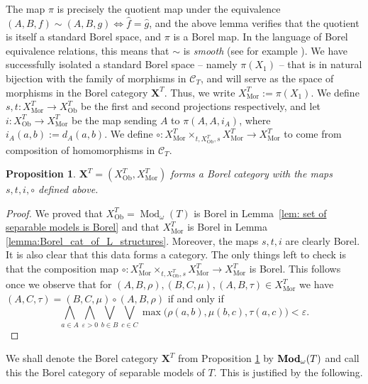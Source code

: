 \documentclass[12pt]{amsart}
\newtheorem{proposition}[theorem]{Proposition}
\DeclareMathOperator{\Mod}{Mod}
\DeclareMathOperator{\bfMod}{\bf{Mod}}
\DeclareMathOperator{\Mor}{Mor}
\DeclareMathOperator{\Ob}{Ob}
\newcommand{\theory}{T}
\begin{document}
The map $\pi$ is precisely the quotient map under the equivalence $(A,B,f)\sim(A,B,g) \iff \widehat{f}=\widehat{g}$, and the above lemma verifies that the quotient is itself a standard Borel space, and $\pi$ is a Borel map. In the language of Borel equivalence relations, this means that $\sim$ is \textit{smooth} (see for example \cite[Definition 3.11]{Kechris_2024}).
We have successfully isolated a standard Borel space -- namely $\pi(X_1)$ -- that is in natural bijection with the family of morphisms in $\mathcal{C}_{\theory}$, and will serve as the space of morphisms in the Borel category $\mathbf{X}^{\theory}$. Thus, we write $X^{\theory}_{\Mor}:=\pi(X_1)$. We define $s,t \colon X^{\theory}_{\Mor} \to X^{\theory}_{\Ob}$ be the first and second projections respectively, and let $i \colon X^{\theory}_{\Ob} \to X^{\theory}_{\Mor}$ be the map sending $A$ to $\pi(A,A,i_A)$, where $i_A(a,b):=d_A(a,b)$. We define $\circ \colon X^{\theory}_{\Mor} \times_{t, X^{\theory}_{\Ob},s} X^{\theory}_{\Mor} \to X^{\theory}_{\Mor}$ to come from composition of homomorphisms in $\mathcal{C}_{\theory}$.

\begin{proposition}\label{proposition:Borel_category_of_L_structures}
    $\mathbf{X}^{\theory}=(X^{\theory}_{\Ob},X^{\theory}_{\Mor})$ forms a Borel category with the maps $s, t, i, \circ$ defined above.
\end{proposition}
\begin{proof}
    We proved that $X^{\theory}_{\Ob}=\Mod_\omega(\theory)$ is Borel in Lemma~\ref{lem: set of separable models is Borel} and that $X^{\theory}_{\Mor}$ is Borel in Lemma \ref{lemma:Borel_cat_of_L_structures}. Moreover, the maps $s,t,i$ are clearly Borel. It is also clear that this data forms a category. The only things left to check is
    that the composition map $\circ \colon X^{\theory}_{\Mor}\times_{t, X^{\theory}_{\Ob},s} X^{\theory}_{\Mor} \to X^{\theory}_{\Mor}$ is Borel.
    This follows once we observe that for $(A,B,\rho),(B,C,\mu),(A,B,\tau)\in X^{\theory}_{\Mor}$ we have $(A,C,\tau)=(B,C,\mu)\circ(A,B,\rho)$ if and only if
    \[\bigwedge_{a\in A}\bigwedge_{\varepsilon>0}\bigvee_{b\in B}\bigvee_{c\in C}\max\big(\rho(a,b),\mu(b,c),\tau(a,c)\big)<\varepsilon.\]
\end{proof}

We shall denote the Borel category $\mathbf{X}^{\theory}$ from Proposition \ref{proposition:Borel_category_of_L_structures} by $\bfMod_\omega(\theory)$ and call this the Borel category of separable models of $\theory$. This is justified by the following.
\end{document}
